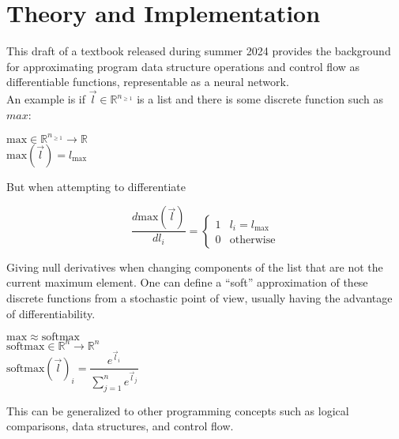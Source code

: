 \documentclass{article}
\begin{document}
\section*{Theory and Implementation}
This draft of a textbook \cite{blondel2024elementsdifferentiableprogramming} released during summer 2024 provides the background for approximating program data structure operations and control flow as differentiable functions, representable as a neural network.\\
An example is if $\vec{l} \in \mathbb{R}^{n_{\ge 1}}$ is a list and there is some discrete function such as $max$:
\begin{center}
  $\mathrm{max} \in \mathbb{R}^{n_{\ge 1}} \rightarrow \mathbb{R}$\\
  $\mathrm{max}(\vec{l}) = l_{\mathrm{max}}$
\end{center}
But when attempting to differentiate
\begin{center}
  $$\dfrac{d \mathrm{max}(\vec{l})}{dl_i} = \left\{
  \begin{array}{ll}
    1 & l_i = l_{\mathrm{max}} \\
    0 & \mathrm{otherwise}
  \end{array} 
  \right.$$
\end{center}
Giving null derivatives when changing components of the list that are not the current maximum element.
One can define a ``soft'' approximation of these discrete functions from a stochastic point of view, usually having the advantage of differentiability.
\begin{center}
  $\mathrm{max} \approx \mathrm{softmax}$\\
  $\mathrm{softmax} \in \mathbb{R}^n \rightarrow \mathbb{R}^n$\\
  $\mathrm{softmax}(\vec{l})_i = \dfrac{e^{\vec{l}_i}}{\sum_{j=1}^n e^{\vec{l}_j}}$\\
\end{center}
This can be generalized to other programming concepts such as logical comparisons, data structures, and control flow.
\end{document}
